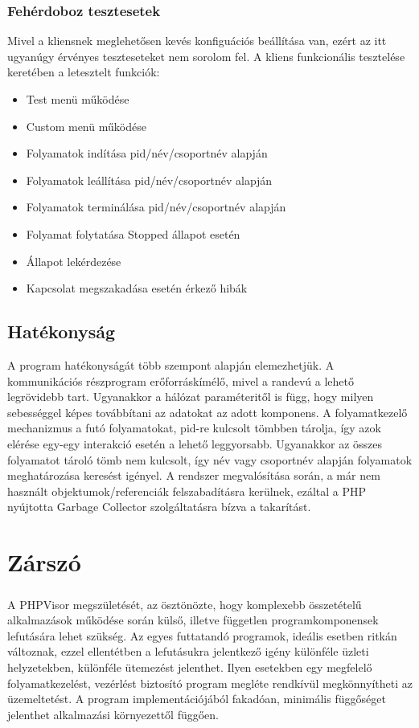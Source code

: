 \documentclass[12pt]{report}
\begin{document}
\subsection{Fehérdoboz tesztesetek}
Mivel a kliensnek meglehetősen kevés konfiguációs beállítása van, ezért az itt ugyanúgy érvényes teszteseteket nem sorolom fel. A kliens funkcionális tesztelése keretében a letesztelt funkciók:
\begin{itemize}
\item Test menü működése
\item Custom menü működése
\item Folyamatok indítása pid/név/csoportnév alapján
\item Folyamatok leállítása pid/név/csoportnév alapján
\item Folyamatok terminálása pid/név/csoportnév alapján
\item Folyamat folytatása Stopped állapot esetén
\item Állapot lekérdezése
\item Kapcsolat megszakadása esetén érkező hibák
\end{itemize}

\section{Hatékonyság}
A program hatékonyságát több szempont alapján elemezhetjük. A kommunikációs részprogram erőforráskímélő, mivel a randevú a lehető legrövidebb tart. Ugyanakkor a hálózat paraméteritől is függ, hogy milyen sebességgel képes továbbítani az adatokat az adott komponens.
A folyamatkezelő mechanizmus a futó folyamatokat, pid-re kulcsolt tömbben tárolja, így azok elérése egy-egy interakció esetén a lehető leggyorsabb. Ugyanakkor az összes folyamatot tároló tömb nem kulcsolt, így név vagy csoportnév alapján folyamatok meghatározása keresést igényel.
A rendszer megvalósítása során, a már nem használt objektumok/referenciák felszabadításra kerülnek, ezáltal a PHP nyújtotta Garbage Collector szolgáltatásra bízva a takarítást.
  
\chapter{Zárszó} 
\paragraph{}
A PHPVisor megszületését, az ösztönözte, hogy komplexebb összetételű alkalmazások működése során külső, illetve független programkomponensek lefutására lehet szükség.
Az egyes futtatandó programok, ideális esetben ritkán változnak, ezzel ellentétben a lefutásukra jelentkező igény különféle üzleti helyzetekben, különféle ütemezést jelenthet.
Ilyen esetekben egy megfelelő folyamatkezelést, vezérlést biztosító program megléte rendkívül megkönnyítheti az üzemeltetést. A program implementációjából fakadóan, minimális függőséget jelenthet alkalmazási környezettől függően.
\end{document}
